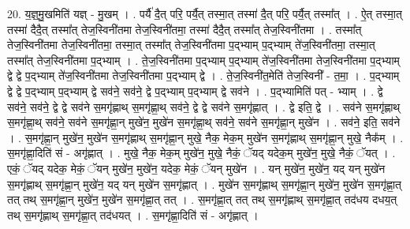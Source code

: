 \documentclass[17pt]{extarticle}
\begin{document}
20. य॒ज्ञ्॒मु॒खमिति॑ यज्ञ् - मु॒खम् । . पर्यै॑ दै॒त् परि॒ पर्यै॒त् तस्मा॒त् तस्मा॑ दै॒त् परि॒ पर्यै॒त् तस्मा᳚त् । . ऐ॒त् तस्मा॒त् तस्मा॑ दैदै॒त् तस्मा᳚त् तेज॒स्विनी॑तमा तेज॒स्विनी॑तमा॒ तस्मा॑ दैदै॒त् तस्मा᳚त् तेज॒स्विनी॑तमा । . तस्मा᳚त् तेज॒स्विनी॑तमा तेज॒स्विनी॑तमा॒ तस्मा॒त् तस्मा᳚त् तेज॒स्विनी॑तमा प॒द्भ्याम् प॒द्भ्याम् ते॑ज॒स्विनी॑तमा॒ तस्मा॒त् तस्मा᳚त् तेज॒स्विनी॑तमा प॒द्भ्याम् । . ते॒ज॒स्विनी॑तमा प॒द्भ्याम् प॒द्भ्याम् ते॑ज॒स्विनी॑तमा तेज॒स्विनी॑तमा प॒द्भ्याम् द्वे द्वे प॒द्भ्याम् ते॑ज॒स्विनी॑तमा तेज॒स्विनी॑तमा प॒द्भ्याम् द्वे । . ते॒ज॒स्विनी॑त॒मेति॑ तेज॒स्विनी᳚ - त॒मा॒ । . प॒द्भ्याम् द्वे द्वे प॒द्भ्याम् प॒द्भ्याम् द्वे सव॑ने॒ सव॑ने॒ द्वे प॒द्भ्याम् प॒द्भ्याम् द्वे सव॑ने । . प॒द्भ्यामिति॑ पत् - भ्याम् । . द्वे सव॑ने॒ सव॑ने॒ द्वे द्वे सव॑ने स॒मगृ॑ह्णाथ् स॒मगृ॑ह्णा॒थ् सव॑ने॒ द्वे द्वे सव॑ने स॒मगृ॑ह्णात् । . द्वे इति॒ द्वे । . सव॑ने स॒मगृ॑ह्णाथ् स॒मगृ॑ह्णा॒थ् सव॑ने॒ सव॑ने स॒मगृ॑ह्णा॒न् मुखे॑न॒ मुखे॑न स॒मगृ॑ह्णा॒थ् सव॑ने॒ सव॑ने स॒मगृ॑ह्णा॒न् मुखे॑न । . सव॑ने॒ इति॒ सव॑ने । . स॒मगृ॑ह्णा॒न् मुखे॑न॒ मुखे॑न स॒मगृ॑ह्णाथ् स॒मगृ॑ह्णा॒न् मुखे॒ नैक॒ मेक॒म् मुखे॑न स॒मगृ॑ह्णाथ् स॒मगृ॑ह्णा॒न् मुखे॒ नैक᳚म् । . स॒मगृ॑ह्णा॒दिति॑ सं - अगृ॑ह्णात् । . मुखे॒ नैक॒ मेक॒म् मुखे॑न॒ मुखे॒ नैकं॒ ॅयद् यदेक॒म् मुखे॑न॒ मुखे॒ नैकं॒ ॅयत् । . एकं॒ ॅयद् यदेक॒ मेकं॒ ॅयन् मुखे॑न॒ मुखे॑न॒ यदेक॒ मेकं॒ ॅयन् मुखे॑न । . यन् मुखे॑न॒ मुखे॑न॒ यद् यन् मुखे॑न स॒मगृ॑ह्णाथ् स॒मगृ॑ह्णा॒न् मुखे॑न॒ यद् यन् मुखे॑न स॒मगृ॑ह्णात् । . मुखे॑न स॒मगृ॑ह्णाथ् स॒मगृ॑ह्णा॒न् मुखे॑न॒ मुखे॑न स॒मगृ॑ह्णा॒त् तत् तथ् स॒मगृ॑ह्णा॒न् मुखे॑न॒ मुखे॑न स॒मगृ॑ह्णा॒त् तत् । . स॒मगृ॑ह्णा॒त् तत् तथ् स॒मगृ॑ह्णाथ् स॒मगृ॑ह्णा॒त् तद॑धय दधय॒त् तथ् स॒मगृ॑ह्णाथ् स॒मगृ॑ह्णा॒त् तद॑धयत् । . स॒मगृ॑ह्णा॒दिति॑ सं - अगृ॑ह्णात् । \newline
\end{document}
